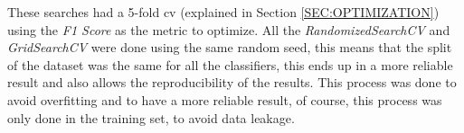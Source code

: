 These searches had a 5-fold \ac{cv} (explained in Section \ref{SEC:OPTIMIZATION}) using the \textit{F1 Score} as the metric to optimize. All the \textit{RandomizedSearchCV} and \textit{GridSearchCV} were done using the same random seed, this means that the split of the dataset was the same for all the classifiers, this ends up in a more reliable result and also allows the reproducibility of the results. This process was done to avoid overfitting and to have a more reliable result, of course, this process was only done in the training set, to avoid data leakage.